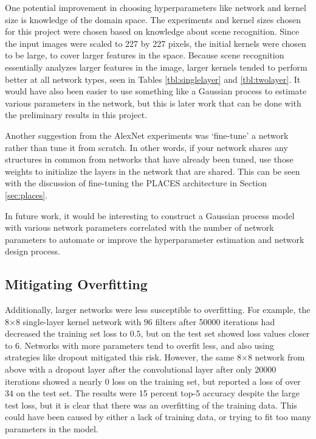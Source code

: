 \documentclass[10pt]{article}
\begin{document}
One potential improvement in choosing hyperparameters like network and kernel size is knowledge of the domain space. The experiments and kernel sizes chosen for this project were chosen based on knowledge about scene recognition. Since the input images were scaled to 227 by 227 pixels, the initial kernels were chosen to be large, to cover larger features in the space. Because scene recognition essentially analyzes larger features in the image, larger kernels tended to perform better at all network types, seen in Tables \ref{tbl:singlelayer} and \ref{tbl:twolayer}. It would have also been easier to use something like a Gaussian process to estimate various parameters in the network, but this is later work that can be done with the preliminary results in this project.

Another suggestion from the AlexNet experiments \cite{krizhevsky_imagenet_2012} was `fine-tune' a network rather than tune it from scratch. In other words, if your network shares any structures in common from networks that have already been tuned, use those weights to initialize the layers in the network that are shared. This can be seen with the discussion of fine-tuning the PLACES architecture in Section \ref{sec:places}.

In future work, it would be interesting to construct a Gaussian process model with various network parameters correlated with the number of network parameters to automate or improve the hyperparameter estimation and network design process.

\subsection{Mitigating Overfitting}

Additionally, larger networks were less susceptible to overfitting. For example, the 8$\times$8 single-layer kernel network with 96 filters after 50000 iterations had decreased the training set loss to $0.5$, but on the test set showed loss values closer to $6$. Networks with more parameters tend to overfit less, and also using strategies like dropout mitigated this risk. However, the same 8$\times$8 network from above with a dropout layer after the convolutional layer after only 20000 iterations showed a nearly 0 loss on the training set, but reported a loss of over $34$ on the test set. The results were 15 percent top-5 accuracy despite the large test loss, but it is clear that there was an overfitting of the training data. This could have been caused by either a lack of training data, or trying to fit too many parameters in the model.
\end{document}
